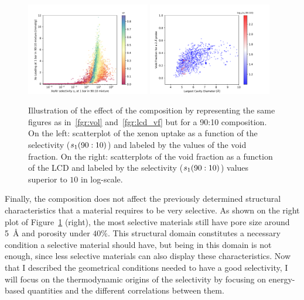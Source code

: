 \documentclass[main.tex]{subfiles}
\begin{document}
\begin{figure}[ht!]
  \centering
  \includegraphics[width=0.48\textwidth]{figures/2-thermo/Scatterplot_uptake_selectivity_vol_9010.pdf}  
  \includegraphics[width=0.48\textwidth]{figures/2-thermo/Scatterplot_vf_lcd_selectivity9010.pdf}
  \caption{Illustration of the effect of the composition by representing the same figures as in~\ref{fgr:vol} and~\ref{fgr:lcd_vf} but for a 90:10 composition. On the left: scatterplot of the xenon uptake as a function of the selectivity ($s_{\text{1}}(90:10)$) and labeled by the values of the void fraction. On the right: scatterplots of the void fraction as a function of the LCD and labeled by the selectivity ($s_{\text{1}}(90:10)$) values superior to $10$ in log-scale.}\label{fgr:compo}
\end{figure}

Finally, the composition does not affect the previously determined structural characteristics that a material requires to be very selective. As shown on the right plot of Figure~\ref{fgr:compo} (right), the most selective materials still have pore size around \SI{5}{\angstrom} and porosity under {$40$\%}. This structural domain constitutes a necessary condition a selective material should have, but being in this domain is not enough, since less selective materials can also display these characteristics. Now that I described the geometrical conditions needed to have a good selectivity, I will focus on the thermodynamic origins of the selectivity by focusing on energy-based quantities and the different correlations between them.
\end{document}
